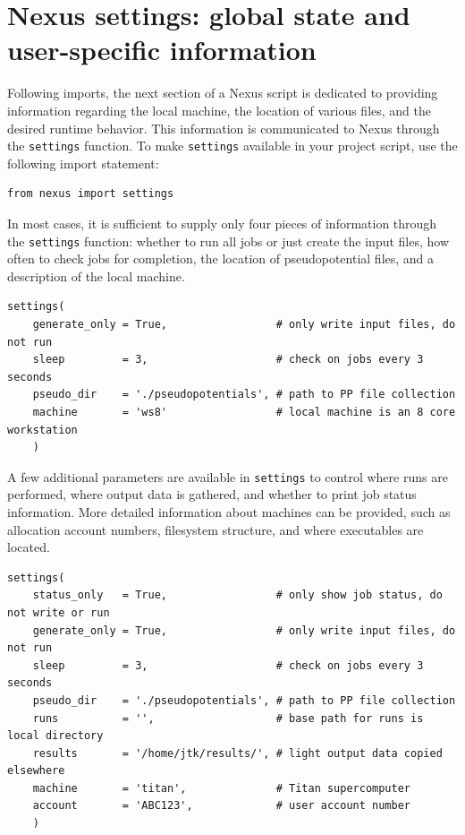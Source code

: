 \documentclass[oneside,11pt]{memoir}
\numberwithin{equation}{section}
\begin{document}
\section{Nexus settings: global state and user-specific information}\label{sec:user_settings}
Following imports, the next section of a Nexus script is dedicated to providing 
information regarding the local machine, the location of various files, and 
the desired runtime behavior.  This information is 
communicated to Nexus through the \texttt{settings} function. 
To make \texttt{settings} available in your project script, use the following import 
statement:
\newline
\begin{verbatim}
from nexus import settings
\end{verbatim}
In most cases, it is sufficient to supply only four pieces of information 
through the \texttt{settings} function: whether to run all jobs or just create 
the input files, how often to check jobs for completion, the location of 
pseudopotential files, and a description of the local machine.
\begin{verbatim}
settings(
    generate_only = True,                 # only write input files, do not run
    sleep         = 3,                    # check on jobs every 3 seconds
    pseudo_dir    = './pseudopotentials', # path to PP file collection
    machine       = 'ws8'                 # local machine is an 8 core workstation
    )
\end{verbatim}

A few additional parameters are available in \texttt{settings} to control where 
runs are performed, where output data is gathered, and whether to print job 
status information.  More detailed information about  
machines can be provided, such as allocation account numbers, filesystem 
structure, and where executables are located.
\begin{verbatim}
settings(
    status_only   = True,                 # only show job status, do not write or run
    generate_only = True,                 # only write input files, do not run
    sleep         = 3,                    # check on jobs every 3 seconds
    pseudo_dir    = './pseudopotentials', # path to PP file collection
    runs          = '',                   # base path for runs is local directory
    results       = '/home/jtk/results/', # light output data copied elsewhere
    machine       = 'titan',              # Titan supercomputer
    account       = 'ABC123',             # user account number
    )
\end{verbatim}
\end{document}
